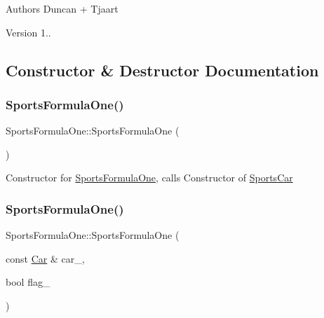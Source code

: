\begin{DoxyAuthor}{Authors}
Duncan + Tjaart 
\end{DoxyAuthor}
\begin{DoxyVersion}{Version}
1.. 
\end{DoxyVersion}


\subsection{Constructor \& Destructor Documentation}
\mbox{\label{class_sports_formula_one_aad78fa26995b5d94452fac1c2f86bf09}} 
\subsubsection{\texorpdfstring{Sports\+Formula\+One()}{SportsFormulaOne()}\hspace{0.1cm}{\footnotesize\ttfamily [1/2]}}
{\footnotesize\ttfamily Sports\+Formula\+One\+::\+Sports\+Formula\+One (\begin{DoxyParamCaption}{ }\end{DoxyParamCaption})\hspace{0.3cm}{\ttfamily [inline]}}

Constructor for \mbox{\hyperlink{class_sports_formula_one}{Sports\+Formula\+One}}, calls Constructor of \mbox{\hyperlink{class_sports_car}{Sports\+Car}} \mbox{\label{class_sports_formula_one_a4b89c4741faa5b5ecfcda5c81fc86a37}} 
\subsubsection{\texorpdfstring{Sports\+Formula\+One()}{SportsFormulaOne()}\hspace{0.1cm}{\footnotesize\ttfamily [2/2]}}
{\footnotesize\ttfamily Sports\+Formula\+One\+::\+Sports\+Formula\+One (\begin{DoxyParamCaption}\item[{const \mbox{\hyperlink{class_car}{Car}} \&}]{car\+\_\+,  }\item[{bool}]{flag\+\_\+ }\end{DoxyParamCaption})\hspace{0.3cm}{\ttfamily [inline]}}

